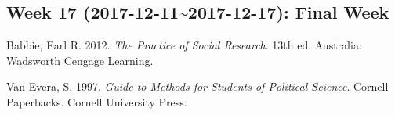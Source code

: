 \documentclass[11pt,]{article}
\begin{document}
\subsection*{Week 17 (2017-12-11\textasciitilde{}2017-12-17): Final
Week}\label{week-17-2017-12-112017-12-17-final-week}

\hypertarget{refs}{}
\hypertarget{ref-Babbie2012}{}
Babbie, Earl R. 2012. \emph{The Practice of Social Research}. 13th ed.
Australia: Wadsworth Cengage Learning.

\hypertarget{ref-VanEvera1997}{}
Van Evera, S. 1997. \emph{Guide to Methods for Students of Political
Science}. Cornell Paperbacks. Cornell University Press.
\end{document}
